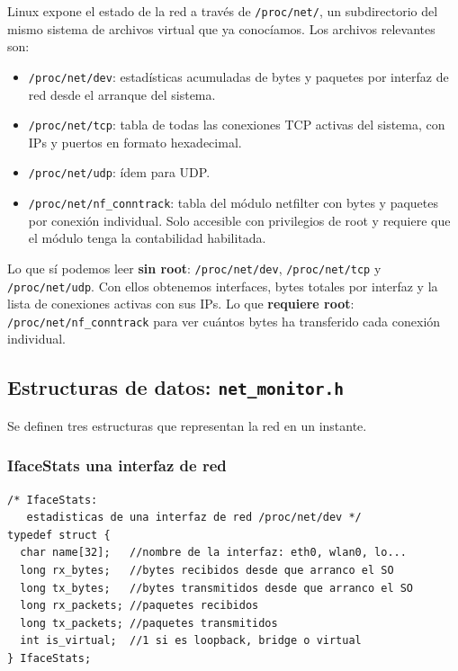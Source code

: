 \documentclass[12pt,letterpaper]{article}
\begin{document}
\medskip

Linux expone el estado de la red a través de \texttt{/proc/net/}, un subdirectorio del mismo sistema de archivos
virtual que ya conocíamos. Los archivos relevantes son:

\begin{itemize}[leftmargin=1.5cm]
\item \texttt{/proc/net/dev}: estadísticas acumuladas de bytes y paquetes por interfaz de red desde el arranque
  del sistema.
\item \texttt{/proc/net/tcp}: tabla de todas las conexiones TCP activas del sistema, con IPs y puertos en formato
  hexadecimal.
\item \texttt{/proc/net/udp}: ídem para UDP.
\item \texttt{/proc/net/nf\_conntrack}: tabla del módulo netfilter con bytes y paquetes por conexión individual.
  Solo accesible con privilegios de root y requiere que el módulo tenga la contabilidad habilitada.
\end{itemize}

\medskip

Lo que sí podemos leer \textbf{sin root}: \texttt{/proc/net/dev}, \texttt{/proc/net/tcp} y
\texttt{/proc/net/udp}. Con ellos obtenemos interfaces, bytes totales por interfaz y la lista de conexiones
activas con sus IPs. Lo que \textbf{requiere root}: \texttt{/proc/net/nf\_conntrack} para ver cuántos bytes
ha transferido cada conexión individual.

\subsection*{Estructuras de datos: \texttt{net\_monitor.h}}

Se definen tres estructuras que representan la red en un instante.

\subsubsection*{IfaceStats una interfaz de red}

\begin{lstlisting}[style=modernc, caption={\texttt{net\_monitor.h}, struct IfaceStats}]
/* IfaceStats:
   estadisticas de una interfaz de red /proc/net/dev */
typedef struct {
  char name[32];   //nombre de la interfaz: eth0, wlan0, lo...
  long rx_bytes;   //bytes recibidos desde que arranco el SO
  long tx_bytes;   //bytes transmitidos desde que arranco el SO
  long rx_packets; //paquetes recibidos
  long tx_packets; //paquetes transmitidos
  int is_virtual;  //1 si es loopback, bridge o virtual
} IfaceStats;
\end{lstlisting}
\end{document}
